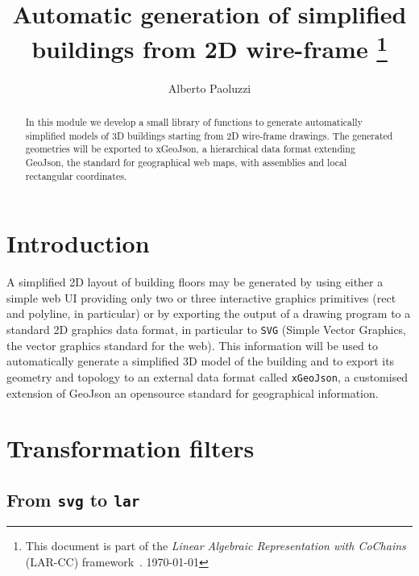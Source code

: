 \documentclass[11pt,oneside]{article}	%
\title{Automatic generation of simplified buildings from 2D wire-frame
\footnote{This document is part of the \emph{Linear Algebraic Representation with CoChains} (LAR-CC) framework~\cite{cclar-proj:2013:00}. \today}
}
\author{Alberto Paoluzzi}
\begin{document}
\maketitle
\nonstopmode

\begin{abstract}
In this module we develop a small library of functions to generate automatically simplified models of 3D buildings starting from 2D wire-frame drawings. The generated geometries will be exported to xGeoJson, a hierarchical data format extending GeoJson, the standard for geographical web maps, with assemblies and local rectangular coordinates. 
\end{abstract}

\tableofcontents

\section{Introduction}

A simplified 2D layout of building floors may be generated by using either a simple web UI providing only two or three interactive graphics primitives (rect and polyline, in particular) or by exporting the output of a drawing program to a standard 2D graphics data format, in particular to \texttt{SVG} (Simple Vector Graphics, the vector graphics standard for the web). This information will be used to automatically generate a simplified 3D model of the building and to export its geometry and topology to an external data format called \texttt{xGeoJson}, a customised extension of GeoJson an opensource standard for geographical information.


\section{Transformation filters}

\subsection{From \texttt{svg} to \texttt{lar}}
\end{document}
